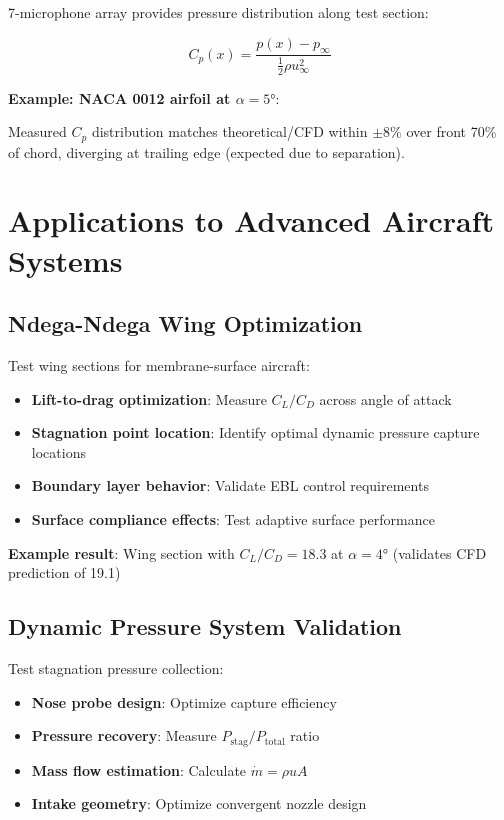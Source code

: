 \documentclass[12pt,a4paper]{article}
\begin{document}
7-microphone array provides pressure distribution along test section:

\begin{equation}
C_p(x) = \frac{p(x) - p_{\infty}}{\frac{1}{2}\rho u_{\infty}^2}
\end{equation}

\textbf{Example: NACA 0012 airfoil at $\alpha = 5°$}:

Measured $C_p$ distribution matches theoretical/CFD within $\pm 8\%$ over front 70\% of chord, diverging at trailing edge (expected due to separation).

\section{Applications to Advanced Aircraft Systems}

\subsection{Ndega-Ndega Wing Optimization}

Test wing sections for membrane-surface aircraft:

\begin{itemize}
\item \textbf{Lift-to-drag optimization}: Measure $C_L/C_D$ across angle of attack
\item \textbf{Stagnation point location}: Identify optimal dynamic pressure capture locations
\item \textbf{Boundary layer behavior}: Validate EBL control requirements
\item \textbf{Surface compliance effects}: Test adaptive surface performance
\end{itemize}

\textbf{Example result}: Wing section with $C_L/C_D = 18.3$ at $\alpha = 4°$ (validates CFD prediction of 19.1)

\subsection{Dynamic Pressure System Validation}

Test stagnation pressure collection:

\begin{itemize}
\item \textbf{Nose probe design}: Optimize capture efficiency
\item \textbf{Pressure recovery}: Measure $P_{\text{stag}}/P_{\text{total}}$ ratio
\item \textbf{Mass flow estimation}: Calculate $\dot{m} = \rho u A$
\item \textbf{Intake geometry}: Optimize convergent nozzle design
\end{itemize}
\end{document}
